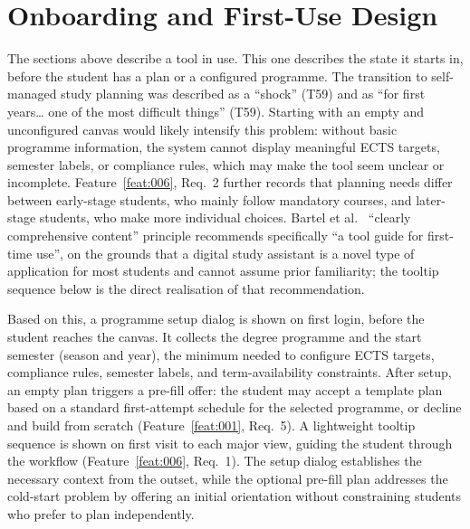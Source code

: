 \section{Onboarding and First-Use Design}
\label{sec:onboarding}
The sections above describe a tool in use. This one describes the state it starts in, before the student has a plan or a configured programme. The transition to self-managed study planning was described as a \enquote{shock} (T59) and as \enquote{for first years… one of the most difficult things} (T59). Starting with an empty and unconfigured canvas would likely intensify this problem: without basic programme information, the system cannot display meaningful ECTS targets, semester labels, or compliance rules, which may make the tool seem unclear or incomplete. Feature~\ref{feat:006}, Req.~2 further records that planning needs differ between early-stage students, who mainly follow mandatory courses, and later-stage students, who make more individual choices. Bartel et al.~\cite{bartel_design_2024} \enquote{clearly comprehensive content} principle recommends specifically \enquote{a tool guide for first-time use}, on the grounds that a digital study assistant is a novel type of application for most students and cannot assume prior familiarity; the tooltip sequence below is the direct realisation of that recommendation.

Based on this, a programme setup dialog is shown on first login, before the student reaches the canvas. It collects the degree programme and the start semester (season and year), the minimum needed to configure ECTS targets, compliance rules, semester labels, and term-availability constraints. After setup, an empty plan triggers a pre-fill offer: the student may accept a template plan based on a standard first-attempt schedule for the selected programme, or decline and build from scratch (Feature~\ref{feat:001}, Req.~5). A lightweight tooltip sequence is shown on first visit to each major view, guiding the student through the workflow (Feature~\ref{feat:006}, Req.~1). The setup dialog establishes the necessary context from the outset, while the optional pre-fill plan addresses the cold-start problem by offering an initial orientation without constraining students who prefer to plan independently.


